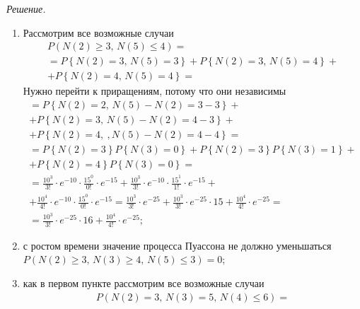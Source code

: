 \textit{Решение.}
\begin{enumerate}[label=\alph*)]
  \item Рассмотрим все возможные случаи
  \begin{gather*}
    P \left( N \left( 2 \right) \geq 3, \, N \left( 5 \right) \leq 4 \right) = \\
    = P \left\{ N \left( 2 \right) = 3, \, N \left( 5 \right) = 3 \right\} +
    P \left\{ N \left( 2 \right) = 3, \, N \left( 5 \right) = 4 \right\} + \\
    + P \left\{ N \left( 2 \right) = 4, \, N \left( 5 \right) = 4 \right\} =
  \end{gather*}
  Нужно перейти к приращениям, потому что они независимы
  \begin{gather*}
    = P \left\{
      N \left( 2 \right) = 2, \, N \left( 5 \right) - N \left( 2 \right) = 3 - 3 \right\} + \\
    + P \left\{
      N \left( 2 \right) = 3, \, N \left( 5 \right) - N \left( 2 \right) = 4 - 3 \right\} + \\
    + P \left\{
      N \left( 2 \right) = 4, \ ,N \left( 5 \right) - N \left( 2 \right) = 4 - 4 \right\} = \\
    = P \left\{ N \left( 2 \right) = 3 \right\} P \left\{ N \left( 3 \right) = 0 \right\} +
    P \left\{ N \left( 2 \right) = 3 \right\} P \left\{ N \left( 3 \right) = 1 \right\} + \\
    + P \left\{ N \left( 2 \right) = 4 \right\} P \left\{ N \left( 3 \right) = 0 \right\} = \\
    = \frac{10^3}{3!} \cdot e^{-10} \cdot \frac{15^0}{0!} \cdot e^{-15} +
    \frac{10^3}{3!} \cdot e^{-10} \cdot \frac{15^1}{1!} \cdot e^{-15} + \\
    + \frac{10^4}{4!} \cdot e^{-10} \cdot \frac{15^0}{0!} \cdot e^{-15} =
    \frac{10^3}{3!} \cdot e^{-25} + \frac{10^3}{3!} \cdot e^{-25} \cdot 15 +
    \frac{10^4}{4!} \cdot e^{-25} = \\
    = \frac{10^3}{3!} \cdot e^{-25} \cdot 16 + \frac{10^4}{4!} \cdot e^{-25};
  \end{gather*}
  \item с ростом времени значение процесса Пуассона не должно уменьшаться
  $P \left(
    N \left( 2 \right) \geq 3, \, N \left( 3 \right) \geq 4, \, N \left( 5 \right) \leq 3 \right) =
    0$;
  \item как в первом пункте рассмотрим все возможные случаи
  \begin{gather*}
    P \left(
    N \left( 2 \right) = 3, \, N \left( 3 \right) = 5, \, N \left( 4 \right) \leq 6 \right) = \\

\end{gather*}
\end{enumerate}
